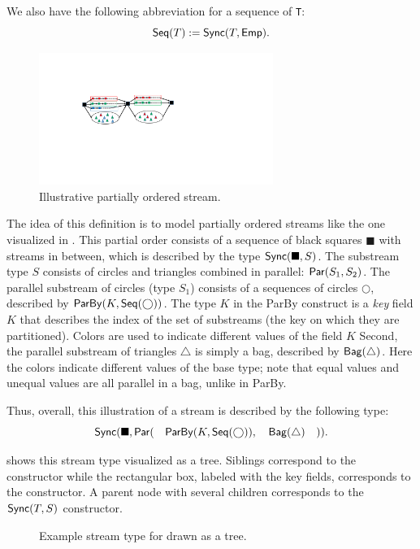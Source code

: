 We also have the following abbreviation for a sequence of \texttt{T}:
\[
  \mathsf{Seq}({T}) := \mathsf{Sync}({T}, \mathsf{Emp}{}).
\]

\begin{figure}
  \centering
  \includegraphics[width=3in]{figures/synchschemas/SPS2.pdf}
  \caption{Illustrative partially ordered stream.}
  \label{45:fig:gps-sps}
\end{figure}

The idea of this definition is to model partially ordered streams like the one visualized in .
This partial order consists of a sequence of black squares $\blacksquare$ with streams in between, which is described by the type $\mathsf{Sync}({\blacksquare}, S)$.
The substream type $S$ consists of circles and triangles combined in parallel: $\mathsf{Par}({S_1}, {S_2})$.
The parallel substream of circles (type $S_1$) consists of a sequences of circles $\bigcirc$, described by $\mathsf{ParBy}({K}, \mathsf{Seq}({\bigcirc}))$.
The type $K$ in the ParBy construct is a \emph{key} field $K$ that describes the index of the set of substreams (the key on which they are partitioned).
Colors are used to indicate different values of the field $K$
Second, the parallel substream of triangles $\triangle$ is simply a bag, described by $\mathsf{Bag}({\triangle})$.
Here the colors indicate different values of the base type; note that equal values and unequal values are all parallel in a bag, unlike in ParBy.

Thus, overall, this illustration of a stream is described by the following type:
\[
\mathsf{Sync}({\blacksquare}, \mathsf{Par}({ \quad \mathsf{ParBy}({K}, \mathsf{Seq}({\bigcirc}))}, {\quad \mathsf{Bag}({\triangle}) \quad})).
\]

 shows this stream type visualized as a tree.
Siblings correspond to the  constructor while the rectangular box,
labeled with the key fields, corresponds to the  constructor.
A parent node with several children corresponds to the $\mathsf{Sync}({T}, S)$ constructor.

\begin{figure}[t]
  \centering
  \caption{Example stream type for  drawn as a tree.}
  \label{45:fig:example-schema}
\end{figure}


